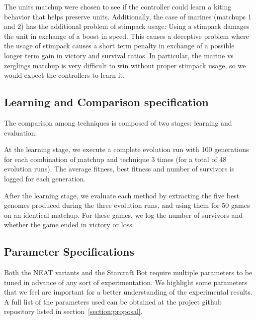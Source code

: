 The units matchup were chosen to see if the controller could learn a
kiting behavior that helps preserve units. Additionally, the case of
marines (matchups 1 and 2) has the additional problem of stimpack
usage: Using a stimpack damages the unit in exchange of a boost in
speed. This causes a deceptive problem where the usage of stimpack
causes a short term penalty in exchange of a possible longer term gain
in victory and survival ratios. In particular, the marine vs zerglings
matchup is very difficult to win without proper stimpack usage, so we
would expect the controllers to learn it.

\subsection{Learning and Comparison specification}

The comparison among techniques is composed of two stages: learning
and evaluation.

At the learning stage, we execute a complete evolution run with 100
generations for each combination of matchup and technique 3 times (for
a total of 48 evolution runs). The average fitness, best fitness and
number of survivors is logged for each generation.

After the learning stage, we evaluate each method by extracting the
five best genomes produced during the three evolution runs, and using
them for 50 games on an identical matchup. For these games, we log
the number of survivors and whether the game ended in victory or loss.

\subsection{Parameter Specifications}

Both the NEAT variants and the Starcraft Bot require multiple
parameters to be tuned in advance of any sort of experimentation. We
highlight some parameters that we feel are important for a better
understanding of the experimental results. A full list of the
parameters used can be obtained at the project github repository
listed in section~\ref{section:proposal}.


